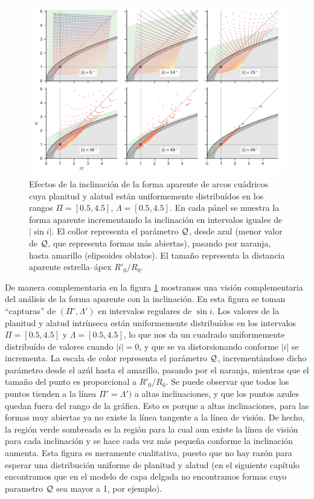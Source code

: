 \begin{figure}
  \includegraphics[width=\linewidth]{./Figures/projected-R90-Rc-snapshots}
  \caption{Efectos de la inclinación de la forma aparente de arcos cuádricos cuya planitud y alatud están uniformemente distribuídos en los rangos $\Pi = [0.5, 4.5]$, $\Lambda = [0.5, 4.5]$. En cada pánel se muestra la forma aparente incrementando la inclinación en intervalos iguales de $|\sin i|$. El collor representa el parámetro $\mathcal{Q}$, desde azul (menor valor de $\mathcal{Q}$, que representa formas más abiertas), pasando por naranja, hasta amarillo (elipsoides oblatos). El tamaño representa la distancia aparente estrella--ápex $R'_0/R_0$.}
  \label{fig:snapshots}
\end{figure}


De manera complementaria en la figura \ref{fig:snapshots} mostramos una visión complementaria del análisis de la forma aparente con la inclinación. En esta figura se toman ``capturas'' de $(\Pi', \Lambda')$ en intervalos regulares de $\sin i$. Los valores de la planitud y alatud intrínseca están uniformemente distribuídos en los intervalos $\Pi = [0.5, 4.5]$ y $\Lambda = [0.5, 4.5]$, lo que nos da un cuadrado uniformemente distribuído de valores cuando $|i| = 0$, y que se va distorsionando conforme $|i|$ se incrementa. La escala de color representa el parámetro $\mathcal{Q}$, incrementándose dicho parámetro desde el azúl hasta el amarillo, pasando por el naranja, mientras que el tamaño del punto es proporcional a $R'_0/R_0$. Se puede observar que todos los puntos tienden a la línea $\Pi' = \Lambda')$ a altas inclinaciones, y que los puntos azules quedan fuera del rango de la gráfica. Esto es porque a altas inclinaciones, para las formas muy abiertas ya no existe la línea tangente a la línea de visión. De hecho, la región verde sombreada es la región para la cual aun existe la línea de visión para cada inclinación y se hace cada vez más pequeña conforme la inclinación aumenta. Esta figura es meramente cualitativa, puesto que no hay razón para esperar una distribución uniforme de planitud y alatud (en el siguiente capítulo encontramos que en el modelo de capa delgada no encontramos formas cuyo parametro $\mathcal{Q}$ sea mayor a 1, por ejemplo).

